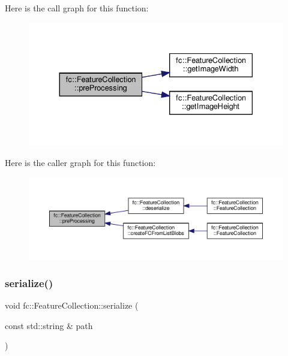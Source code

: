 Here is the call graph for this function\+:
\nopagebreak
\begin{figure}[H]
\begin{center}
\leavevmode
\includegraphics[width=330pt]{d9/d78/classfc_1_1FeatureCollection_ae2de0cf9672c5391f54b4882b86b57a2_cgraph}
\end{center}
\end{figure}
Here is the caller graph for this function\+:
\nopagebreak
\begin{figure}[H]
\begin{center}
\leavevmode
\includegraphics[width=350pt]{d9/d78/classfc_1_1FeatureCollection_ae2de0cf9672c5391f54b4882b86b57a2_icgraph}
\end{center}
\end{figure}
\mbox{\label{classfc_1_1FeatureCollection_a4a95b20ba9f339a326878591a244b50d}} 
\subsubsection{\texorpdfstring{serialize()}{serialize()}}
{\footnotesize\ttfamily void fc\+::\+Feature\+Collection\+::serialize (\begin{DoxyParamCaption}\item[{const std\+::string \&}]{path }\end{DoxyParamCaption})\hspace{0.3cm}{\ttfamily [inline]}}



